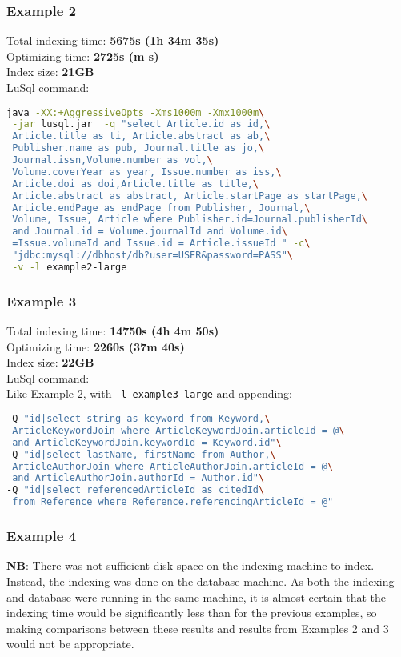 \subsubsection{Example 2}
Total indexing time: {\bf 5675s (1h 34m 35s)} \\
Optimizing time: {\bf 2725s (m s)} \\
Index size: {\bf 21GB} \\

\noindent LuSql command:
\begin{lstlisting}[backgroundcolor=\color{grey},language=Bash]
java -XX:+AggressiveOpts -Xms1000m -Xmx1000m\
 -jar lusql.jar  -q "select Article.id as id,\
 Article.title as ti, Article.abstract as ab,\
 Publisher.name as pub, Journal.title as jo,\
 Journal.issn,Volume.number as vol,\
 Volume.coverYear as year, Issue.number as iss,\
 Article.doi as doi,Article.title as title,\
 Article.abstract as abstract, Article.startPage as startPage,\
 Article.endPage as endPage from Publisher, Journal,\
 Volume, Issue, Article where Publisher.id=Journal.publisherId\
 and Journal.id = Volume.journalId and Volume.id\
 =Issue.volumeId and Issue.id = Article.issueId " -c\
 "jdbc:mysql://dbhost/db?user=USER&password=PASS"\
 -v -l example2-large
\end{lstlisting}


\subsubsection{Example 3}
Total indexing time: {\bf 14750s (4h 4m 50s)} \\
Optimizing time: {\bf 2260s (37m 40s)} \\
Index size: {\bf 22GB} \\

\noindent LuSql command:  \\
Like Example 2, with  {\tt -l example3-large} and appending:
\begin{lstlisting}[backgroundcolor=\color{grey},language=Bash]
-Q "id|select string as keyword from Keyword,\
 ArticleKeywordJoin where ArticleKeywordJoin.articleId = @\
 and ArticleKeywordJoin.keywordId = Keyword.id"\
-Q "id|select lastName, firstName from Author,\
 ArticleAuthorJoin where ArticleAuthorJoin.articleId = @\
 and ArticleAuthorJoin.authorId = Author.id"\
-Q "id|select referencedArticleId as citedId\
 from Reference where Reference.referencingArticleId = @"
\end{lstlisting}

\subsubsection{Example 4}
{\bf NB}: There was not sufficient disk space on the indexing machine to
index. 
Instead, the indexing was done on the database machine.
As both the indexing and database were running in the same machine, it is
almost certain that the indexing time would be significantly less than for the
previous examples, so making comparisons between these results and results
from Examples 2 and 3 would not be appropriate. \\


